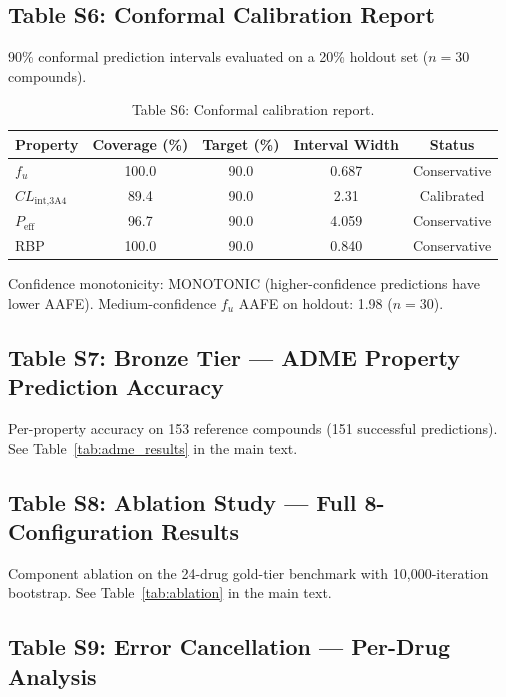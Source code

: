 \documentclass[review,3p]{elsarticle}
\begin{document}
\subsection*{Table S6: Conformal Calibration Report}
\label{tab:s6}

90\% conformal prediction intervals evaluated on a 20\% holdout set ($n=30$ compounds).

\begin{table}[H]
\centering
\caption*{Table S6: Conformal calibration report.}
\begin{tabular}{lcccc}
\toprule
Property & Coverage (\%) & Target (\%) & Interval Width & Status \\
\midrule
$f_u$ & 100.0 & 90.0 & 0.687 & Conservative \\
$CL_{\text{int,3A4}}$ & 89.4 & 90.0 & 2.31 & Calibrated \\
$P_{\text{eff}}$ & 96.7 & 90.0 & 4.059 & Conservative \\
RBP & 100.0 & 90.0 & 0.840 & Conservative \\
\bottomrule
\end{tabular}
\end{table}

Confidence monotonicity: MONOTONIC (higher-confidence predictions have lower AAFE). Medium-confidence $f_u$ AAFE on holdout: 1.98 ($n=30$).

\subsection*{Table S7: Bronze Tier --- ADME Property Prediction Accuracy}
\label{tab:s7}

Per-property accuracy on 153 reference compounds (151 successful predictions). See Table~\ref{tab:adme_results} in the main text.

\subsection*{Table S8: Ablation Study --- Full 8-Configuration Results}
\label{tab:s8}

Component ablation on the 24-drug gold-tier benchmark with 10{,}000-iteration bootstrap. See Table~\ref{tab:ablation} in the main text.

\subsection*{Table S9: Error Cancellation --- Per-Drug Analysis}
\label{tab:s9}
\end{document}
